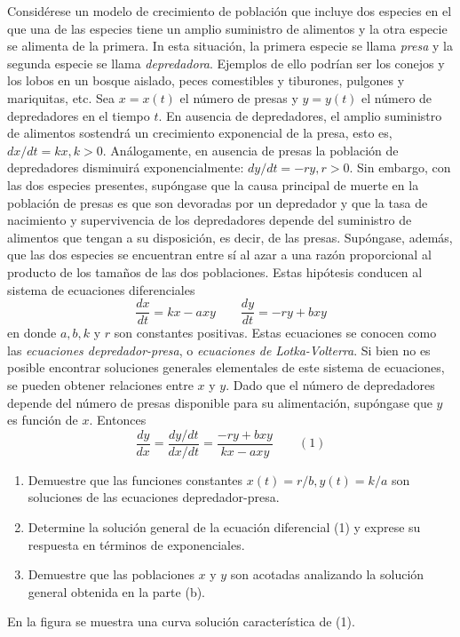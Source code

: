 \item Considérese un modelo de crecimiento de población que incluye dos especies en el que una de las especies tiene un amplio suministro de alimentos y la otra especie se alimenta de la primera. In esta situación, la primera especie se llama \textit{presa} y la segunda especie se llama \textit{depredadora}. Ejemplos de ello podrían ser los conejos y los lobos en un bosque aislado, peces comestibles y tiburones, pulgones y mariquitas, etc. Sea $x = x(t)$ el número de presas y $y = y(t)$ el número de depredadores en el tiempo $t$. En ausencia de depredadores, el amplio suministro de alimentos sostendrá un crecimiento exponencial de la presa, esto es, $dx/dt = kx, k > 0$. Análogamente, en ausencia de presas la población de depredadores disminuirá exponencialmente: $dy/dt = -ry, r > 0$. Sin embargo, con las dos especies presentes, supóngase que la causa principal de muerte en la población de presas es que son devoradas por un depredador y que la tasa de nacimiento y supervivencia de los depredadores depende del suministro de alimentos que tengan a su disposición, es decir, de las presas. Supóngase, además, que las dos especies se encuentran entre sí al azar a una razón proporcional al producto de los tamaños de las dos poblaciones. Estas hipótesis conducen al sistema de ecuaciones diferenciales
    \[ \frac{dx}{dt} = kx - axy \qquad \frac{dy}{dt} = -ry + bxy \]
    en donde $a, b, k$ y $r$ son constantes positivas. Estas ecuaciones se conocen como las \textit{ecuaciones depredador-presa}, o \textit{ecuaciones de Lotka-Volterra}. Si bien no es posible encontrar soluciones generales elementales de este sistema de ecuaciones, se pueden obtener relaciones entre $x$ y $y$. Dado que el número de depredadores depende del número de presas disponible para su alimentación, supóngase que $y$ es función de $x$. Entonces
    \[ \frac{dy}{dx} = \frac{dy/dt}{dx/dt} = \frac{-ry + bxy}{kx - axy} \qquad (1) \]
    \begin{enumerate}
        \item[(a)] Demuestre que las funciones constantes $x(t) = r/b, y(t) = k/a$ son soluciones de las ecuaciones depredador-presa.
        \item[(b)] Determine la solución general de la ecuación diferencial (1) y exprese su respuesta en términos de exponenciales.
        \item[(c)] Demuestre que las poblaciones $x$ y $y$ son acotadas analizando la solución general obtenida en la parte (b).
    \end{enumerate}
    En la figura se muestra una curva solución característica de (1).
    
    \begin{center}
    \end{center}
